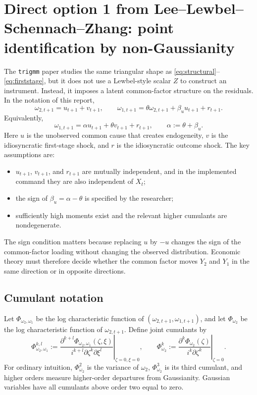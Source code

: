 \documentclass[11pt]{article}
\theoremstyle{plain}
\theoremstyle{definition}
\theoremstyle{remark}
\begin{document}
\section{Direct option 1 from Lee--Lewbel--Schennach--Zhang: point identification by non-Gaussianity}
\label{sec:lsz-point}

The \texttt{trigmm} paper studies the same triangular shape as
\eqref{eq:structural}--\eqref{eq:firststage}, but it does not use a
Lewbel-style scalar $Z$ to construct an instrument. Instead, it imposes a latent
common-factor structure on the residuals. In the notation of this report,
\begin{equation}
\omega_{2,t+1}=u_{t+1}+v_{t+1},
\qquad
\omega_{1,t+1}=\theta \omega_{2,t+1}+\beta_u u_{t+1}+r_{t+1}.
\label{eq:lsz-raw}
\end{equation}
Equivalently,
\begin{equation}
\omega_{1,t+1}=\alpha u_{t+1}+\theta v_{t+1}+r_{t+1},
\qquad
\alpha:=\theta+\beta_u.
\label{eq:alpha-def}
\end{equation}
Here $u$ is the unobserved common cause that creates endogeneity, $v$ is the
idiosyncratic first-stage shock, and $r$ is the idiosyncratic outcome shock. The
key assumptions are:
\begin{itemize}
\item $u_{t+1}$, $v_{t+1}$, and $r_{t+1}$ are mutually independent, and in the
implemented command they are also independent of $X_t$;
\item the sign of $\beta_u=\alpha-\theta$ is specified by the researcher;
\item sufficiently high moments exist and the relevant higher cumulants are
nondegenerate.
\end{itemize}
The sign condition matters because replacing $u$ by $-u$ changes the sign of the
common-factor loading without changing the observed distribution. Economic theory
must therefore decide whether the common factor moves $Y_2$ and $Y_1$ in the
same direction or in opposite directions.

\subsection{Cumulant notation}

Let $\Phi_{\omega_2,\omega_1}$ be the log characteristic function of
$(\omega_{2,t+1},\omega_{1,t+1})$, and let $\Phi_{\omega_2}$ be the log characteristic function of
$\omega_{2,t+1}$. Define joint cumulants by
\begin{equation}
\Phi_{\omega_2,\omega_1}^{k,l}:=
\left.
\frac{\partial^{k+l}\Phi_{\omega_2,\omega_1}(\zeta,\xi)}
     {i^{k+l}\partial\zeta^k\partial\xi^l}
\right|_{\zeta=0,\xi=0},
\qquad
\Phi_{\omega_2}^{k}:=
\left.
\frac{\partial^{k}\Phi_{\omega_2}(\zeta)}
     {i^{k}\partial\zeta^k}
\right|_{\zeta=0}.
\label{eq:cumulants}
\end{equation}
For ordinary intuition, $\Phi_{\omega_2}^2$ is the variance of $\omega_2$, $\Phi_{\omega_2}^3$
is its third cumulant, and higher orders measure higher-order departures from
Gaussianity. Gaussian variables have all cumulants above order two equal to zero.
\end{document}

